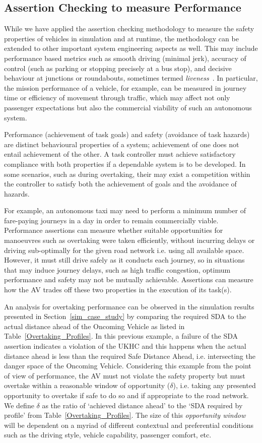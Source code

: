 \subsection{Assertion Checking to measure Performance}
While we have applied the assertion checking methodology to measure the safety properties of vehicles in simulation and at runtime, the methodology can be extended to other important system engineering aspects as well. This may include performance based metrics such as smooth driving (minimal jerk), accuracy of control (such as parking or stopping precisely at a bus stop), and decisive behaviour at junctions or roundabouts, sometimes termed \emph{liveness}~\cite{kim2014mpc}. In particular, the mission performance of a vehicle, for example, can be measured in journey time or efficiency of movement through traffic, which may affect not only passenger expectations but also the commercial viability of such an autonomous system. 

Performance (achievement of task goals) and safety (avoidance of task hazards) are distinct behavioural properties of a system; achievement of one does not entail achievement of the other. A task controller must achieve satisfactory compliance with both properties if a dependable system is to be developed. In some scenarios, such as during overtaking, their may exist a competition within the controller to satisfy both the achievement of goals and the avoidance of hazards. 

For example, an autonomous taxi may need to perform a minimum number of fare-paying journeys in a day in order to remain commercially viable. Performance assertions can measure whether suitable opportunities for manoeuvres such as overtaking were taken efficiently, without incurring delays or driving sub-optimally for the given road network i.e. using all available space. However, it must still drive safely as it conducts each journey, so in situations that may induce journey delays, such as high traffic congestion, optimum performance and safety may not be mutually achievable. Assertions can measure how the AV trades off these two properties in the execution of its task(s).

An analysis for overtaking performance can be observed in the simulation results presented in Section~\ref{sim_case_study} by comparing the required SDA to the actual distance ahead of the Oncoming Vehicle as listed in Table~\ref{Overtaking_Profiles}. In this previous example, a failure of the SDA assertion indicates a violation of the UKHC and this happens when the actual distance ahead is less than the required Safe Distance Ahead, i.e. intersecting the danger space of the Oncoming Vehicle. Considering this example from the point of view of performance, the AV must not violate the safety property but must overtake within a reasonable window of opportunity ($\delta$), i.e. taking any presented opportunity to overtake if safe to do so and if appropriate to the road network. We define $\delta$ as the ratio of `achieved distance ahead' to the `SDA required by profile' from Table~\ref{Overtaking_Profiles}. The size of this \emph{opportunity window} will be dependent on a myriad of different contextual and preferential conditions such as the driving style, vehicle capability, passenger comfort, etc. 

